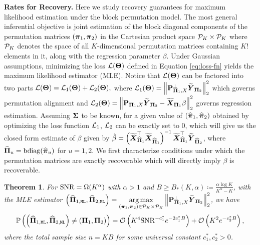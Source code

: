 \documentclass[numsec,webpdf,modern,medium,namedate]{oup-authoring-template}
\theoremstyle{thmstyleone}%
\newtheorem{theorem}{Theorem}%
\theoremstyle{thmstyletwo}%
\theoremstyle{thmstylethree}%
\begin{document}
\textbf{Rates for Recovery.} Here we study recovery guarantees for maximum likelihood estimation under the block permutation model. The most general inferential objective is joint estimation of the block diagonal components of the permutation matrices $(\boldsymbol{\pi}_1,\boldsymbol{\pi}_2)$ in the Cartesian product space $\mathcal{P}_K \times \mathcal{P}_K$ where $\mathcal{P}_K$ denotes the space of all $ K$-dimensional permutation matrices containing $K!$ elements in it,  along with the regression parameter $\beta$. Under Gaussian assumptions, minimizing the loss $\mathcal{L}(\boldsymbol{\Theta})$ defined in Equation \eqref{eq:loss-fn} yields the maximum likelihood estimator (MLE). Notice that $\mathcal{L}(\boldsymbol{\Theta})$ can be factored into two parts $\mathcal{L}(\boldsymbol{\Theta}) = \mathcal{L}_1(\boldsymbol{\Theta}) + \mathcal{L}_2(\boldsymbol{\Theta}),$ where $\mathcal{L}_1(\boldsymbol{\Theta}) = \left\|\mathbf{P}_{\boldsymbol{\Pi}_1,X}^\perp\widetilde{\boldsymbol{Y}}_{\boldsymbol{\Pi}_2}\right\|^2_2$ which governs permutation alignment and $\mathcal{L}_2(\boldsymbol{\Theta}) = \left\|\mathbf{P}_{\boldsymbol{\Pi}_1,X}\widetilde{\boldsymbol{Y}}_{\boldsymbol{\Pi}_2} - \widetilde{\boldsymbol{X}}_{\boldsymbol{\Pi}_1}\beta\right\|^2_2$ governs regression estimation. Assuming $\boldsymbol{\Sigma}$ to be known, for a given value of $(\widehat{\boldsymbol{\pi}}_1,\widehat{\boldsymbol{\pi}}_2)$ obtained by optimizing the loss function $\mathcal{L}_1$, $\mathcal{L}_2$ can be exactly set to 0, which will give us the closed form estimate of $\beta$ given by $\hat{\beta}  = \left(\widetilde{\boldsymbol{X}}_{\widehat{\boldsymbol{\Pi}}_1}^\top  \widetilde{\boldsymbol{X}}_{\widehat{\boldsymbol{\Pi}}_1}\right)^{-1} \widetilde{\boldsymbol{X}}_{\widehat{\boldsymbol{\Pi}}_1}^\top \widetilde{\boldsymbol{Y}}_{\widehat{\boldsymbol{\Pi}}_2}$, where $\widehat{\boldsymbol{\Pi}}_u = \mathrm{bdiag}(\widehat{\boldsymbol{\pi}}_u)$ for $u = 1,2$.  We first characterize conditions under which the permutation matrices are exactly recoverable which will directly imply $\beta$ is recoverable.

\begin{theorem}\label{thm:error-pi1-pi2}
        For $\mathrm{SNR} = \Omega(K^\alpha)$ with $\alpha >1$ and $B \geq B_\ast(K,\alpha) \coloneq \frac{\alpha\log K}{K^\alpha - K}$, with the MLE estimator $\left( \widehat{\boldsymbol{\Pi}}_{1, \texttt{ML}}, \widehat{\boldsymbol{\Pi}}_{2, \texttt{ML}} \right) = \underset{(\boldsymbol{\pi}_1,\boldsymbol{\pi}_2)\in \mathcal{P}_K\times \mathcal{P}_K}{\operatorname*{arg\,max}} \left\|\mathbf{P}_{\boldsymbol{\Pi}_1,X}^\perp\widetilde{\boldsymbol{Y}}_{\boldsymbol{\Pi}_2}\right\|^2_2$, we have
    \begin{eqnarray*}
        \mathbb{P} \left( \left( \widehat{\boldsymbol{\Pi}}_{1, \texttt{ML}}, \widehat{\boldsymbol{\Pi}}_{2, \texttt{ML}} \right) \neq \left( \boldsymbol{\Pi}_1, \boldsymbol{\Pi}_2 \right) \right) = \mathcal{O}\left(K^4 \mathrm{SNR} ^{-c^\ast_1}e^{-2c^\ast_1B}\right) + \mathcal{O}\left(K^2 e^{-c^\ast_2 B}\right),
    \end{eqnarray*}
    where the total sample size $n = KB$ for some universal constant $c^\ast_1,c^\ast_2 >0$.
\end{theorem}
\end{document}
